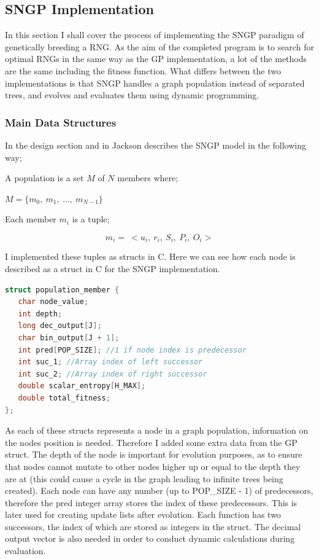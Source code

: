 \documentclass[a4paper,10.5pt]{article}
\begin{document}
\subsection{SNGP Implementation}
In this section I shall cover the process of implementing the SNGP paradigm of genetically breeding a RNG. As the aim of the completed program is to search for optimal RNGs in the same way as the GP implementation, a lot of the methods are the same including the fitness function. What differs between the two implementations is that SNGP handles a graph population instead of separated trees, and evolves and evaluates them using dynamic programming.

\subsubsection{Main Data Structures}
 In the design section and in \cite[p.50-51]{jacksonsngp2} Jackson describes the SNGP model in the following way;

A population is a set $M$ of $N$ members where;
\begin{center}
$M = \{m_0,\ m_1,\ ...,\ m_{N-1}\}$
\end{center}
Each member $m_i$ is a tuple;

\begin{equation*}
m_i = \ <u_i,\ r_i,\ S_i,\ P_i,\ O_i>
\end{equation*}

I implemented these tuples as structs in C. Here we can see how each node is described as a struct in C for the SNGP implementation.

\begin{lstlisting}[language=C]
struct population_member {
   char node_value;
   int depth;
   long dec_output[J];
   char bin_output[J + 1];
   int pred[POP_SIZE]; //1 if node index is predecessor
   int suc_1; //Array index of left successor
   int suc_2; //Array index of right successor 
   double scalar_entropy[H_MAX];
   double total_fitness;
};
\end{lstlisting}

As each of these structs represents a node in a graph population, information on the nodes position is needed. Therefore I added some extra data from the GP struct. The depth of the node is important for evolution purposes, as to ensure that nodes cannot mutate to other nodes higher up or equal to the depth they are at (this could cause a cycle in the graph leading to infinite trees being created). Each node can have any number (up to POP\_SIZE - 1) of predecessors, therefore the pred integer array stores the index of these predecessors. This is later used for creating update lists after evolution. Each function has two successors, the index of which are stored as integers in the struct. The decimal output vector is also needed in order to conduct dynamic calculations during evaluation.
\end{document}
